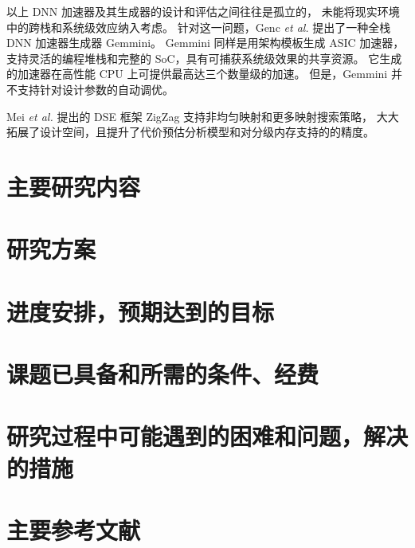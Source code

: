 以上 DNN 加速器及其生成器的设计和评估之间往往是孤立的，
未能将现实环境中的跨栈和系统级效应纳入考虑。
针对这一问题，Genc \textit{et al.}\cite{genc_gemmini_2021}
提出了一种全栈 DNN 加速器生成器 Gemmini。
Gemmini 同样是用架构模板生成 ASIC 加速器，
支持灵活的编程堆栈和完整的 SoC，具有可捕获系统级效果的共享资源。
它生成的加速器在高性能 CPU 上可提供最高达三个数量级的加速。
但是，Gemmini 并不支持针对设计参数的自动调优。

Mei \textit{et al.}\cite{mei_zigzag_2021}
提出的 DSE 框架 ZigZag 支持非均匀映射和更多映射搜索策略，
大大拓展了设计空间，且提升了代价预估分析模型和对分级内存支持的的精度。

\section{主要研究内容}
\section{研究方案}
\section{进度安排，预期达到的目标}
\section{课题已具备和所需的条件、经费}
\section{研究过程中可能遇到的困难和问题，解决的措施}
\section{主要参考文献}



